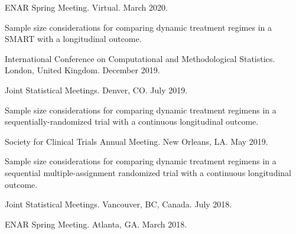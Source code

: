 \documentclass[letterpaper,11pt]{article} %
\begin{document}
\begin{etaremune}
		\begin{conflist}
			\item ENAR Spring Meeting. Virtual. March 2020.
		\end{conflist}
		\item Sample size considerations for comparing dynamic treatment regimes in a SMART with a longitudinal outcome.
		\begin{conflist}
			\item International Conference on Computational and Methodological Statistics. London, United Kingdom. December 2019.
			\item Joint Statistical Meetings. Denver, CO. July 2019.
		\end{conflist}
		\item Sample size considerations for comparing dynamic treatment regimens in a sequentially-randomized trial with a continuous longitudinal outcome.
		\begin{conflist}
			\item Society for Clinical Trials Annual Meeting. New Orleans, LA.  May 2019.
		\end{conflist}
		\item Sample size considerations for comparing dynamic treatment regimens in a sequential multiple-assignment randomized trial with a continuous longitudinal outcome.
		\begin{conflist}
			\item Joint Statistical Meetings. Vancouver, BC, Canada. July 2018.
			\item ENAR Spring Meeting. Atlanta, GA.  March 2018.
		\end{conflist}		
	\end{etaremune}
	
\end{document}
